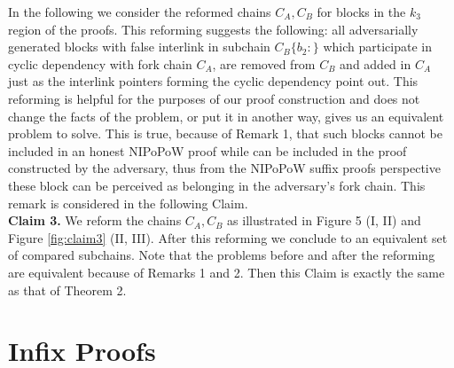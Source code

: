 \documentclass[9pt,a4paper]{article}
\begin{document}
%

In the following we consider the reformed chains $C_A, C_B$ for blocks in the $k_3$ region of the proofs. This reforming suggests the following: all adversarially generated blocks with false interlink in subchain $C_B\{b_2:\}$ which participate in cyclic dependency with fork chain $C_A$, are removed from $C_B$ and added in $C_A$ just as the interlink pointers forming the cyclic dependency point out. This reforming is helpful for the purposes of our proof construction and does not change the facts of the problem, or put it in another way, gives us an equivalent problem to solve. This is true, because of Remark 1, that such blocks cannot be included in an honest NIPoPoW proof while can be included in the proof constructed by the adversary, thus from the NIPoPoW suffix proofs perspective these block can be perceived as belonging in the adversary's fork chain. This remark is considered in the following Claim.\\


\textbf{Claim 3.} We reform the chains $C_A, C_B$ as illustrated in Figure 5 (I, II) and Figure \ref{fig:claim3} (II, III). After this reforming we conclude to an equivalent set of compared subchains. Note that the problems before and after the reforming are equivalent because of Remarks 1 and 2. Then this Claim is exactly the same as that of Theorem 2.



\section{Infix Proofs}

\end{document}
